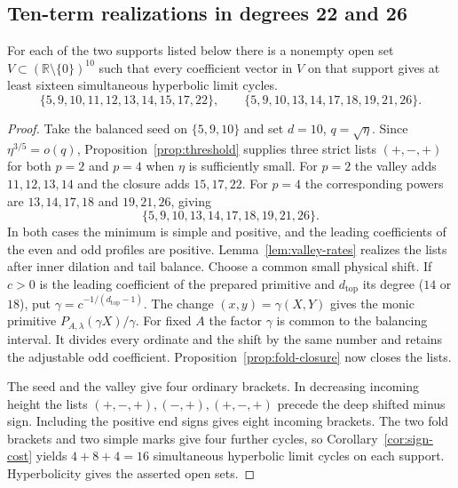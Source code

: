 \subsection{Ten-term realizations in degrees 22 and 26}
\begin{corollary}\label{cor:short-lists}
For each of the two supports listed below there is a nonempty open set
$V\subset(\mathbb R\setminus\{0\})^{10}$ such that every coefficient
vector in $V$ on that support gives at least sixteen simultaneous
hyperbolic limit cycles.
\[
 \{5,9,10,11,12,13,14,15,17,22\},\qquad
 \{5,9,10,13,14,17,18,19,21,26\}.
\]
\end{corollary}
\begin{proof}
Take the balanced seed on $\{5,9,10\}$ and set $d=10$, $q=\sqrt\eta$.
Since $\eta^{3/5}=o(q)$, Proposition~\ref{prop:threshold} supplies three
strict lists $(+,-,+)$ for both $p=2$ and $p=4$ when $\eta$ is
sufficiently small. For $p=2$ the valley adds $11,12,13,14$ and the
closure adds $15,17,22$. For $p=4$ the corresponding powers are
$13,14,17,18$ and $19,21,26$, giving
\begin{equation}\label{eq:portable-support}
 \{5,9,10,13,14,17,18,19,21,26\}.
\end{equation}
In both cases the minimum is simple and positive, and the leading
coefficients of the even and odd profiles are positive.
Lemma~\ref{lem:valley-rates} realizes the lists after inner dilation and
tail balance. Choose a common small physical shift. If $c>0$ is the
leading coefficient of the prepared primitive and $d_{\mathrm{top}}$ its
degree ($14$ or $18$), put $\gamma=c^{-1/(d_{\mathrm{top}}-1)}$. The
change $(x,y)=\gamma(X,Y)$ gives the monic primitive
$P_{A,\lambda}(\gamma X)/\gamma$.
For fixed $A$ the factor $\gamma$ is common to the balancing interval.
It divides every ordinate and the shift by the same number and retains
the adjustable odd coefficient. Proposition~\ref{prop:fold-closure}
now closes the lists.

The seed and the valley give four ordinary brackets. In decreasing incoming
height the lists $(+,-,+),(-,+),(+,-,+)$ precede the deep shifted minus
sign. Including the positive end signs gives eight incoming brackets.
The two fold brackets and two simple marks give four further cycles,
so Corollary~\ref{cor:sign-cost} yields $4+8+4=16$ simultaneous
hyperbolic limit cycles on each support. Hyperbolicity gives the asserted
open sets.
\end{proof}

